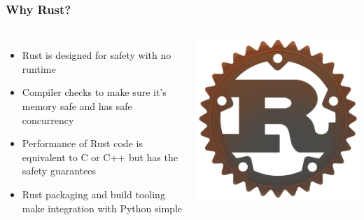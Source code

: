 \documentclass[aspectratio=169,11pt,hyperref={colorlinks=true}]{beamer}
\begin{document}
\begin{frame}
    \frametitle{Why Rust?}
    \begin{columns}
            \begin{itemize}
                \item Rust is designed for safety with no runtime
                \item Compiler checks to make sure it's memory safe and has safe concurrency
                \item Performance of Rust code is equivalent to C or C++ but has the safety guarantees
                \item Rust packaging and build tooling make integration with Python simple
            \end{itemize}
            \includegraphics[width=\textwidth]{rust-logo-512x512.png}
    \end{columns}
\end{frame}
\end{document}
